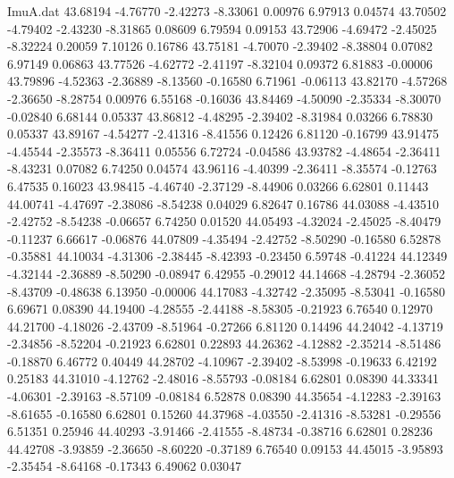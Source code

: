 \begin{filecontents}{ImuA.dat}
  43.68194   -4.76770   -2.42273   -8.33061    0.00976    6.97913    0.04574
  43.70502   -4.79402   -2.43230   -8.31865    0.08609    6.79594    0.09153
  43.72906   -4.69472   -2.45025   -8.32224    0.20059    7.10126    0.16786
  43.75181   -4.70070   -2.39402   -8.38804    0.07082    6.97149    0.06863
  43.77526   -4.62772   -2.41197   -8.32104    0.09372    6.81883   -0.00006
  43.79896   -4.52363   -2.36889   -8.13560   -0.16580    6.71961   -0.06113
  43.82170   -4.57268   -2.36650   -8.28754    0.00976    6.55168   -0.16036
  43.84469   -4.50090   -2.35334   -8.30070   -0.02840    6.68144    0.05337
  43.86812   -4.48295   -2.39402   -8.31984    0.03266    6.78830    0.05337
  43.89167   -4.54277   -2.41316   -8.41556    0.12426    6.81120   -0.16799
  43.91475   -4.45544   -2.35573   -8.36411    0.05556    6.72724   -0.04586
  43.93782   -4.48654   -2.36411   -8.43231    0.07082    6.74250    0.04574
  43.96116   -4.40399   -2.36411   -8.35574   -0.12763    6.47535    0.16023
  43.98415   -4.46740   -2.37129   -8.44906    0.03266    6.62801    0.11443
  44.00741   -4.47697   -2.38086   -8.54238    0.04029    6.82647    0.16786
  44.03088   -4.43510   -2.42752   -8.54238   -0.06657    6.74250    0.01520
  44.05493   -4.32024   -2.45025   -8.40479   -0.11237    6.66617   -0.06876
  44.07809   -4.35494   -2.42752   -8.50290   -0.16580    6.52878   -0.35881
  44.10034   -4.31306   -2.38445   -8.42393   -0.23450    6.59748   -0.41224
  44.12349   -4.32144   -2.36889   -8.50290   -0.08947    6.42955   -0.29012
  44.14668   -4.28794   -2.36052   -8.43709   -0.48638    6.13950   -0.00006
  44.17083   -4.32742   -2.35095   -8.53041   -0.16580    6.69671    0.08390
  44.19400   -4.28555   -2.44188   -8.58305   -0.21923    6.76540    0.12970
  44.21700   -4.18026   -2.43709   -8.51964   -0.27266    6.81120    0.14496
  44.24042   -4.13719   -2.34856   -8.52204   -0.21923    6.62801    0.22893
  44.26362   -4.12882   -2.35214   -8.51486   -0.18870    6.46772    0.40449
  44.28702   -4.10967   -2.39402   -8.53998   -0.19633    6.42192    0.25183
  44.31010   -4.12762   -2.48016   -8.55793   -0.08184    6.62801    0.08390
  44.33341   -4.06301   -2.39163   -8.57109   -0.08184    6.52878    0.08390
  44.35654   -4.12283   -2.39163   -8.61655   -0.16580    6.62801    0.15260
  44.37968   -4.03550   -2.41316   -8.53281   -0.29556    6.51351    0.25946
  44.40293   -3.91466   -2.41555   -8.48734   -0.38716    6.62801    0.28236
  44.42708   -3.93859   -2.36650   -8.60220   -0.37189    6.76540    0.09153
  44.45015   -3.95893   -2.35454   -8.64168   -0.17343    6.49062    0.03047

\end{filecontents}
